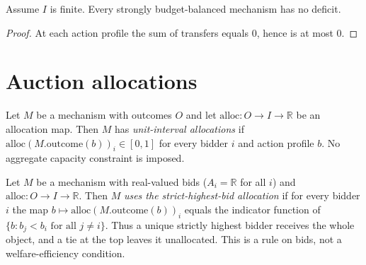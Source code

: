 \begin{lemma}\label{thm:MathEconLib.Mechanism.IsBudgetBalanced.isNoDeficit}\leanok
{}
Assume $I$ is finite. Every strongly budget-balanced mechanism has no deficit.
\end{lemma}
\begin{proof}\leanok
{}
At each action profile the sum of transfers equals $0$, hence is at most $0$.
\end{proof}

\section{Auction allocations}

\begin{definition}\label{def:MathEconLib.Mechanism.Auctions.IsUnitIntervalAllocation}\leanok
{}
Let $M$ be a mechanism with outcomes $O$ and let $\mathrm{alloc}:O\to I\to\mathbb{R}$ be an allocation map. Then $M$ has \emph{unit-interval allocations} if $\mathrm{alloc}(M.\mathrm{outcome}(b))_i\in[0,1]$ for every bidder $i$ and action profile $b$. No aggregate capacity constraint is imposed.
\end{definition}

\begin{definition}\label{def:MathEconLib.Mechanism.Auctions.UsesStrictHighestBidAllocation}\leanok
{}
Let $M$ be a mechanism with real-valued bids ($A_i=\mathbb{R}$ for all $i$) and $\mathrm{alloc}:O\to I\to\mathbb{R}$. Then $M$ \emph{uses the strict-highest-bid allocation} if for every bidder $i$ the map $b\mapsto\mathrm{alloc}(M.\mathrm{outcome}(b))_i$ equals the indicator function of $\{b : b_j<b_i \text{ for all } j\neq i\}$. Thus a unique strictly highest bidder receives the whole object, and a tie at the top leaves it unallocated. This is a rule on bids, not a welfare-efficiency condition.
\end{definition}


